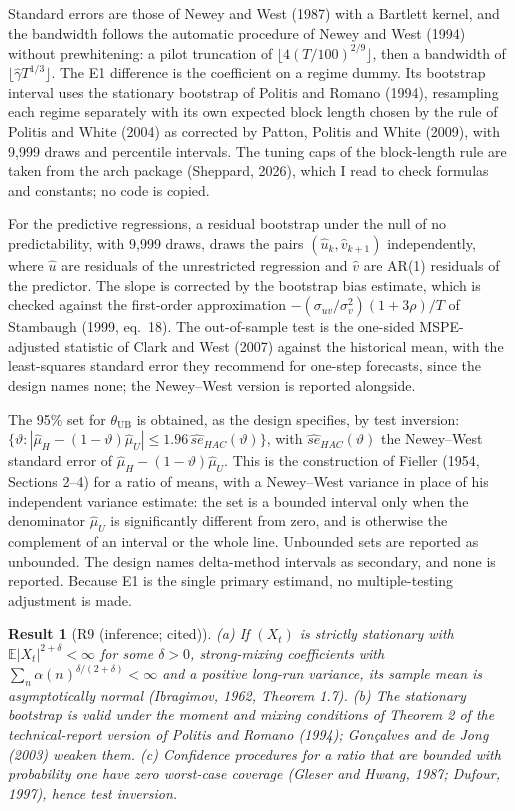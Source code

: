\documentclass[11pt]{article}
\theoremstyle{result}
\newtheorem*{result}{Result}
\newcommand{\E}{\mathbb{E}}
\newcommand{\thUB}{\theta_{\mathrm{UB}}}
\begin{document}
Standard errors are those of Newey and West (1987) with a Bartlett kernel, and the bandwidth follows the automatic procedure of Newey and West (1994) without prewhitening: a pilot truncation of $\lfloor4(T/100)^{2/9}\rfloor$, then a bandwidth of $\lfloor\hat\gamma T^{1/3}\rfloor$. The E1 difference is the coefficient on a regime dummy. Its bootstrap interval uses the stationary bootstrap of Politis and Romano (1994), resampling each regime separately with its own expected block length chosen by the rule of Politis and White (2004) as corrected by Patton, Politis and White (2009), with 9,999 draws and percentile intervals. The tuning caps of the block-length rule are taken from the arch package (Sheppard, 2026), which I read to check formulas and constants; no code is copied.

For the predictive regressions, a residual bootstrap under the null of no predictability, with 9,999 draws, draws the pairs $(\hat u_k,\hat v_{k+1})$ independently, where $\hat u$ are residuals of the unrestricted regression and $\hat v$ are AR(1) residuals of the predictor. The slope is corrected by the bootstrap bias estimate, which is checked against the first-order approximation $-(\sigma_{uv}/\sigma_v^2)(1+3\rho)/T$ of Stambaugh (1999, eq.~18). The out-of-sample test is the one-sided MSPE-adjusted statistic of Clark and West (2007) against the historical mean, with the least-squares standard error they recommend for one-step forecasts, since the design names none; the Newey--West version is reported alongside.

The 95\% set for $\thUB$ is obtained, as the design specifies, by test inversion: $\{\vartheta:|\hat\mu_H-(1-\vartheta)\hat\mu_U|\le1.96\,\widehat{se}_{HAC}(\vartheta)\}$, with $\widehat{se}_{HAC}(\vartheta)$ the Newey--West standard error of $\hat\mu_H-(1-\vartheta)\hat\mu_U$. This is the construction of Fieller (1954, Sections 2--4) for a ratio of means, with a Newey--West variance in place of his independent variance estimate: the set is a bounded interval only when the denominator $\hat\mu_U$ is significantly different from zero, and is otherwise the complement of an interval or the whole line. Unbounded sets are reported as unbounded. The design names delta-method intervals as secondary, and none is reported. Because E1 is the single primary estimand, no multiple-testing adjustment is made.

\begin{result}[R9 (inference; cited)]
(a) If $(X_t)$ is strictly stationary with $\E|X_t|^{2+\delta}<\infty$ for some $\delta>0$, strong-mixing coefficients with $\sum_n\alpha(n)^{\delta/(2+\delta)}<\infty$ and a positive long-run variance, its sample mean is asymptotically normal (Ibragimov, 1962, Theorem 1.7). (b) The stationary bootstrap is valid under the moment and mixing conditions of Theorem 2 of the technical-report version of Politis and Romano (1994); Gon\c{c}alves and de Jong (2003) weaken them. (c) Confidence procedures for a ratio that are bounded with probability one have zero worst-case coverage (Gleser and Hwang, 1987; Dufour, 1997), hence test inversion.
\end{result}
\end{document}
